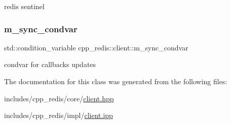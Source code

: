 redis sentinel \mbox{\label{classcpp__redis_1_1client_a3dcead667f0e7a23766fbd35bcf8cfc2}} 
\subsubsection{\texorpdfstring{m\+\_\+sync\+\_\+condvar}{m\_sync\_condvar}}
{\footnotesize\ttfamily std\+::condition\+\_\+variable cpp\+\_\+redis\+::client\+::m\+\_\+sync\+\_\+condvar\hspace{0.3cm}{\ttfamily [private]}}

condvar for callbacks updates 

The documentation for this class was generated from the following files\+:\begin{DoxyCompactItemize}
\item 
includes/cpp\+\_\+redis/core/\hyperlink{client_8hpp}{client.\+hpp}\item 
includes/cpp\+\_\+redis/impl/\hyperlink{client_8ipp}{client.\+ipp}\end{DoxyCompactItemize}
